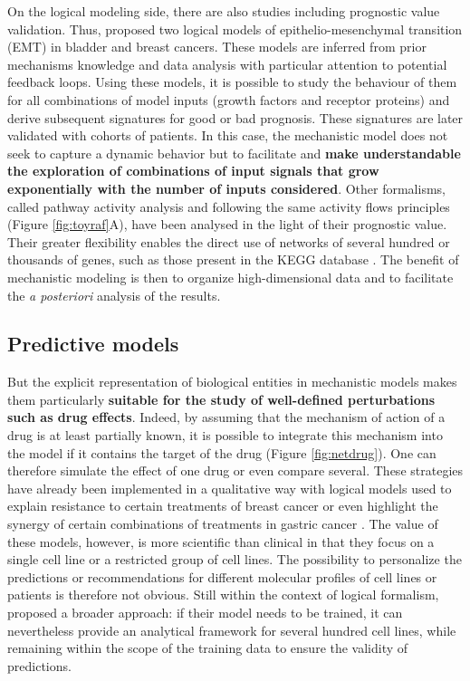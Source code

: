 \documentclass[a4paper,12pt,twoside,onecolumn,openright,final,oldfontcommands]{memoir}
\begin{document}
On the logical modeling side, there are also studies including
prognostic value validation. Thus, \citet{khan2017unraveling} proposed
two logical models of epithelio-mesenchymal transition (EMT) in bladder
and breast cancers. These models are inferred from prior mechanisms
knowledge and data analysis with particular attention to potential
feedback loops. Using these models, it is possible to study the
behaviour of them for all combinations of model inputs (growth factors
and receptor proteins) and derive subsequent signatures for good or bad
prognosis. These signatures are later validated with cohorts of
patients. In this case, the mechanistic model does not seek to capture a
dynamic behavior but to facilitate and \textbf{make understandable the
exploration of combinations of input signals that grow exponentially
with the number of inputs considered}. Other formalisms, called pathway
activity analysis and following the same activity flows principles
(Figure \ref{fig:toyraf}A), have been analysed in the light of their
prognostic value. Their greater flexibility enables the direct use of
networks of several hundred or thousands of genes, such as those present
in the KEGG database \citep{kanehisa2012kegg}. The benefit of
mechanistic modeling is then to organize high-dimensional data and to
facilitate the \emph{a posteriori} analysis of the results.

\subsection{Predictive models}\label{predictive}

But the explicit representation of biological entities in mechanistic
models makes them particularly \textbf{suitable for the study of
well-defined perturbations such as drug effects}. Indeed, by assuming
that the mechanism of action of a drug is at least partially known, it
is possible to integrate this mechanism into the model if it contains
the target of the drug (Figure \ref{fig:netdrug}). One can therefore
simulate the effect of one drug or even compare several. These
strategies have already been implemented in a qualitative way with
logical models used to explain resistance to certain treatments of
breast cancer \citep{zanudo2017network} or even highlight the synergy of
certain combinations of treatments in gastric cancer
\citep{flobak2015discovery}. The value of these models, however, is more
scientific than clinical in that they focus on a single cell line or a
restricted group of cell lines. The possibility to personalize the
predictions or recommendations for different molecular profiles of cell
lines or patients is therefore not obvious. Still within the context of
logical formalism, \citet{knijnenburg2016logic} proposed a broader
approach: if their model needs to be trained, it can nevertheless
provide an analytical framework for several hundred cell lines, while
remaining within the scope of the training data to ensure the validity
of predictions.
\end{document}
